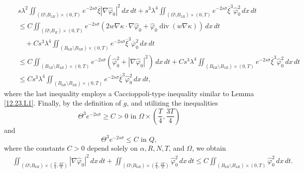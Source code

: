 \documentclass[11pt]{article}
\numberwithin{equation}{section}
\DeclareMathOperator{\Div}{div}
\begin{document}
\begin{eqnarray*}
	&&s\lambda^2 \iint_{(\Omega \setminus B_{5R}) \times (0,T)} e^{-2s\overline{\sigma}} \overline{\xi} |\nabla \widehat{\varphi}_0|^2 \, dx \, dt + s^3\lambda^4 \iint_{(\Omega \setminus B_{5R}) \times (0,T)} e^{-2s\overline{\sigma}} \overline{\xi}^3 \widehat{\varphi}_0^2 \, dx \, dt \\
	&&\leq C\iint_{(\Omega \setminus B_R) \times (0,T)} e^{-2s\overline{\sigma}} \left( 2w\nabla\kappa \cdot \nabla \widehat{\varphi}_0 + \widehat{\varphi}_0 \Div(w\nabla\kappa) \right) \, dx \, dt \\
	&&\quad + Cs^3\lambda^4 \iint_{(B_{6R} \setminus B_{3R}) \times (0,T)} e^{-2s\overline{\sigma}} \overline{\xi}^3 \overline{\varphi}_0^2 \, dx \, dt \\
	&&\leq C\iint_{(B_{5R} \setminus B_{4R}) \times (0,T)} e^{-2s\overline{\sigma}} \left( \widehat{\varphi}_0^2 + |\nabla \widehat{\varphi}_0|^2 \right) \, dx \, dt + Cs^3\lambda^4 \iint_{(B_{6R} \setminus B_{3R}) \times (0,T)} e^{-2s\overline{\sigma}} \overline{\xi}^3 \widehat{\varphi}_0^2 \, dx \, dt \\
	&&\leq Cs^3\lambda^4 \iint_{(B_{6R} \setminus B_{3R}) \times (0,T)} e^{-2s\overline{\sigma}} \overline{\xi}^3 \widehat{\varphi}_0^2 \, dx \, dt,
\end{eqnarray*}
where the last inequality employs a Caccioppoli-type inequality similar to Lemma \ref{12.23.L1}.
Finally, by the definition of $g$, and utilizing the inequalities
\begin{equation*}
	\Theta^3e^{-2s\overline{\sigma}} \geq C > 0   \text{ in } \Omega \times \left(\frac{T}{4}, \frac{3T}{4}\right)
\end{equation*}
and
\begin{equation*}
	\Theta^3e^{-2s\overline{\sigma}} \leq C   \text{ in } Q,
\end{equation*}
where the constants $C > 0$ depend solely on $\alpha, R, N, T$, and $\Omega$, we obtain
\begin{equation*}\label{12.22.3}
	\begin{split}
		&\iint_{(\Omega \setminus B_{6R}) \times \left(\frac{T}{4}, \frac{3T}{4}\right)} |\nabla\widehat{\varphi}_0|^2 \, dx \, dt + \iint_{(\Omega \setminus B_{6R}) \times \left(\frac{T}{4}, \frac{3T}{4}\right)} \widehat{\varphi}_0^2 \, dx \, dt \leq C \iint_{(B_{6R} \setminus B_{4R}) \times (0,T)} \widehat{\varphi}_0^2 \, dx \, dt.
	\end{split}
\end{equation*}
\end{document}
